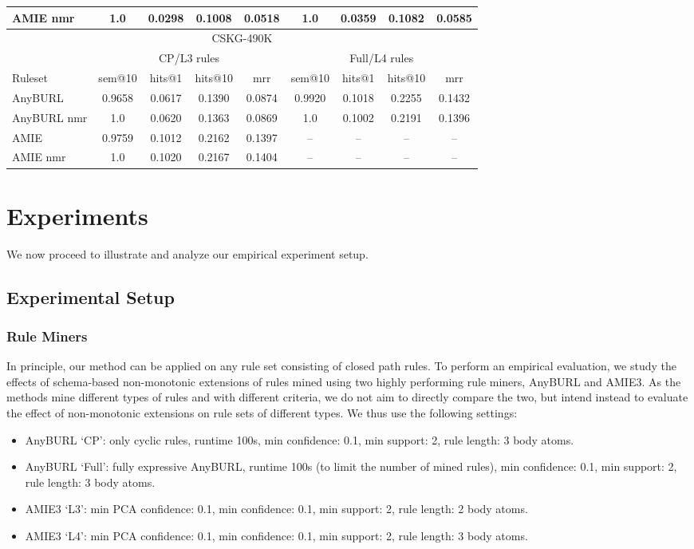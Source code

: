 \documentclass[a4paper,UKenglish,cleveref, autoref, thm-restate]{tgdk-v2021}
\begin{document}
\begin{table}[h]
\begin{tabular}{l | c | c c c | c | c c c}
AMIE nmr & 1.0 & 0.0298 & 0.1008 & 0.0518 & 1.0 & 0.0359 & 0.1082 & 0.0585\\
\midrule
\multicolumn{9}{c}{CSKG-490K} \\
\midrule
& \multicolumn{4}{c|}{CP/L3 rules} & \multicolumn{4}{c}{Full/L4 rules} \\
\cmidrule(lr){2-5} \cmidrule(lr){6-9}
Ruleset & sem@10 & hits@1 & hits@10 & mrr & sem@10 & hits@1 & hits@10 & mrr \\
\midrule
AnyBURL & 0.9658 & 0.0617 & 0.1390 & 0.0874 & 0.9920 & 0.1018 & 0.2255 & 0.1432 \\
AnyBURL nmr & 1.0 & 0.0620 & 0.1363 & 0.0869 & 1.0 & 0.1002 & 0.2191 & 0.1396 \\
AMIE & 0.9759 & 0.1012 & 0.2162 & 0.1397 & -- & -- & -- & --  \\
AMIE nmr & 1.0 & 0.1020 & 0.2167 & 0.1404 & -- & -- & -- & --\\
\bottomrule
\end{tabular}
\end{table}


\section{Experiments} \label{sec:exp}
We now proceed to illustrate and analyze our empirical experiment setup.
\subsection{Experimental Setup}

\subsubsection{Rule Miners} In principle, our method can be applied on any rule set consisting of closed path rules. To perform an empirical evaluation, we study the effects of schema-based non-monotonic extensions of rules mined using two highly performing rule miners, AnyBURL and AMIE3. As  the methods mine different types of rules and with different criteria, we do not aim to directly compare the two, but intend instead to evaluate the effect of non-monotonic extensions on rule sets of different types. We thus use the following settings:
\begin{itemize}
    \item AnyBURL `CP': only cyclic rules, runtime 100s, min confidence: 0.1, min support: 2, rule length: 3 body atoms.
    \item AnyBURL `Full': fully expressive AnyBURL, runtime 100s (to limit the number of mined rules), min confidence: 0.1, min support: 2, rule length: 3 body atoms.
    \item AMIE3 `L3': min PCA confidence: 0.1, min confidence: 0.1, min support: 2, rule length: 2 body atoms.
    \item AMIE3 `L4': min PCA confidence: 0.1, min confidence: 0.1, min support: 2, rule length: 3 body atoms.
\end{itemize}
\end{document}
